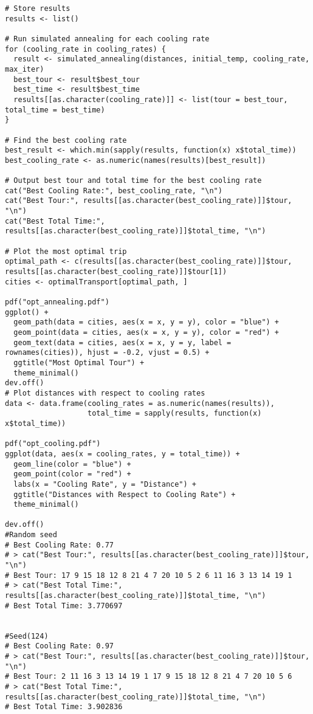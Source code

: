 \begin{tcolorbox}[colback=white!95!black,colframe=white!50!black,breakable]
\begin{lstlisting}[caption={Exercise 4a}, label={lst:simul_anneal}]
# Store results
results <- list()

# Run simulated annealing for each cooling rate
for (cooling_rate in cooling_rates) {
  result <- simulated_annealing(distances, initial_temp, cooling_rate, max_iter)
  best_tour <- result$best_tour
  best_time <- result$best_time
  results[[as.character(cooling_rate)]] <- list(tour = best_tour, total_time = best_time)
}

# Find the best cooling rate
best_result <- which.min(sapply(results, function(x) x$total_time))
best_cooling_rate <- as.numeric(names(results)[best_result])

# Output best tour and total time for the best cooling rate
cat("Best Cooling Rate:", best_cooling_rate, "\n")
cat("Best Tour:", results[[as.character(best_cooling_rate)]]$tour, "\n")
cat("Best Total Time:", results[[as.character(best_cooling_rate)]]$total_time, "\n")

# Plot the most optimal trip
optimal_path <- c(results[[as.character(best_cooling_rate)]]$tour, results[[as.character(best_cooling_rate)]]$tour[1])
cities <- optimalTransport[optimal_path, ]

pdf("opt_annealing.pdf")
ggplot() +
  geom_path(data = cities, aes(x = x, y = y), color = "blue") +
  geom_point(data = cities, aes(x = x, y = y), color = "red") +
  geom_text(data = cities, aes(x = x, y = y, label = rownames(cities)), hjust = -0.2, vjust = 0.5) +
  ggtitle("Most Optimal Tour") +
  theme_minimal()
dev.off()
# Plot distances with respect to cooling rates
data <- data.frame(cooling_rates = as.numeric(names(results)),
                   total_time = sapply(results, function(x) x$total_time))

pdf("opt_cooling.pdf")
ggplot(data, aes(x = cooling_rates, y = total_time)) +
  geom_line(color = "blue") +
  geom_point(color = "red") +
  labs(x = "Cooling Rate", y = "Distance") +
  ggtitle("Distances with Respect to Cooling Rate") +
  theme_minimal()

dev.off()
#Random seed
# Best Cooling Rate: 0.77 
# > cat("Best Tour:", results[[as.character(best_cooling_rate)]]$tour, "\n")
# Best Tour: 17 9 15 18 12 8 21 4 7 20 10 5 2 6 11 16 3 13 14 19 1 
# > cat("Best Total Time:", results[[as.character(best_cooling_rate)]]$total_time, "\n")
# Best Total Time: 3.770697 


#Seed(124)
# Best Cooling Rate: 0.97 
# > cat("Best Tour:", results[[as.character(best_cooling_rate)]]$tour, "\n")
# Best Tour: 2 11 16 3 13 14 19 1 17 9 15 18 12 8 21 4 7 20 10 5 6 
# > cat("Best Total Time:", results[[as.character(best_cooling_rate)]]$total_time, "\n")
# Best Total Time: 3.902836 
\end{lstlisting}
\end{tcolorbox}
\vspace{10mm}
